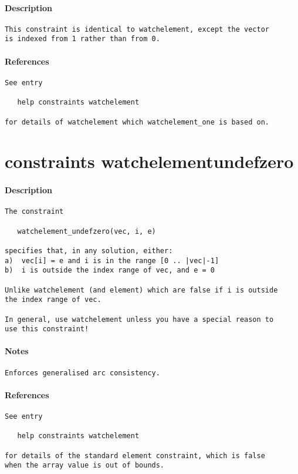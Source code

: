 \paragraph{Description}
{\footnotesize
\begin{verbatim}
This constraint is identical to watchelement, except the vector
is indexed from 1 rather than from 0.
\end{verbatim}
}
\paragraph{References}
{\footnotesize
\begin{verbatim}
See entry

   help constraints watchelement

for details of watchelement which watchelement_one is based on.
\end{verbatim}
}
\section{constraints watchelement\textunderscore undefzero}
\paragraph{Description}
{\footnotesize
\begin{verbatim}
The constraint 

   watchelement_undefzero(vec, i, e)

specifies that, in any solution, either:
a)  vec[i] = e and i is in the range [0 .. |vec|-1]
b)  i is outside the index range of vec, and e = 0

Unlike watchelement (and element) which are false if i is outside
the index range of vec.

In general, use watchelement unless you have a special reason to
use this constraint!
\end{verbatim}
}
\paragraph{Notes}
{\footnotesize
\begin{verbatim}
Enforces generalised arc consistency.
\end{verbatim}
}
\paragraph{References}
{\footnotesize
\begin{verbatim}
See entry

   help constraints watchelement

for details of the standard element constraint, which is false
when the array value is out of bounds.
\end{verbatim}
}
